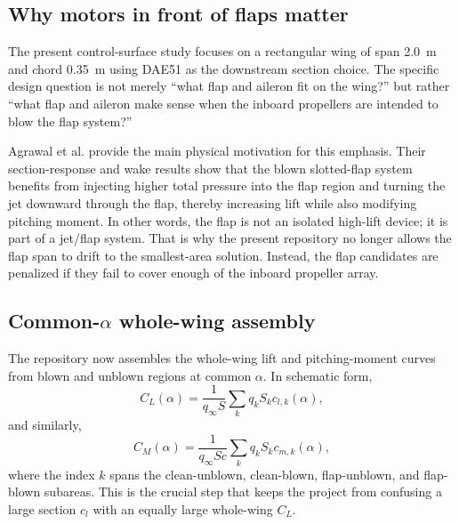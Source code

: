 \documentclass[conf]{new-aiaa}
\begin{document}
\subsection{Why motors in front of flaps matter}

The present control-surface study focuses on a rectangular wing of span \SI{2.0}{m} and chord \SI{0.35}{m} using DAE51 as the downstream section choice. The specific design question is not merely ``what flap and aileron fit on the wing?'' but rather ``what flap and aileron make sense when the inboard propellers are intended to blow the flap system?''

Agrawal et al. provide the main physical motivation for this emphasis. Their section-response and wake results show that the blown slotted-flap system benefits from injecting higher total pressure into the flap region and turning the jet downward through the flap, thereby increasing lift while also modifying pitching moment.\cite{Agrawal2019} In other words, the flap is not an isolated high-lift device; it is part of a jet/flap system. That is why the present repository no longer allows the flap span to drift to the smallest-area solution. Instead, the flap candidates are penalized if they fail to cover enough of the inboard propeller array.

\subsection{Common-\(\alpha\) whole-wing assembly}

The repository now assembles the whole-wing lift and pitching-moment curves from blown and unblown regions at common \(\alpha\). In schematic form,
\begin{equation}
C_L(\alpha)
=
\frac{1}{q_\infty S}\sum_k q_k S_k c_{l,k}(\alpha),
\end{equation}
and similarly,
\begin{equation}
C_M(\alpha)
=
\frac{1}{q_\infty S c}\sum_k q_k S_k c_{m,k}(\alpha),
\end{equation}
where the index \(k\) spans the clean-unblown, clean-blown, flap-unblown, and flap-blown subareas. This is the crucial step that keeps the project from confusing a large section \(c_l\) with an equally large whole-wing \(C_L\).
\end{document}
